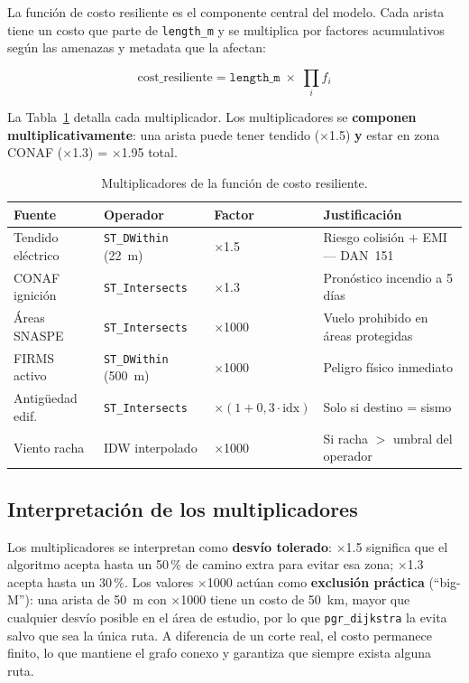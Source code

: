 \documentclass[conference]{IEEEtran}
\begin{document}
La función de costo resiliente es el componente central del modelo. Cada arista tiene un costo que parte de \texttt{length\_m} y se multiplica por factores acumulativos según las amenazas y metadata que la afectan:

\begin{equation}
\boxed{
\text{cost\_resiliente} = \texttt{length\_m} \;\times\; \prod_{i} f_i
}
\label{eq:cost_resiliente}
\end{equation}

La Tabla~\ref{tab:multiplicadores} detalla cada multiplicador. Los multiplicadores se \textbf{componen multiplicativamente}: una arista puede tener tendido ($\times$1.5) \textbf{y} estar en zona CONAF ($\times$1.3) = $\times$1.95 total.

\begin{table}[!htbp]
\centering
\caption{Multiplicadores de la función de costo resiliente.}
\label{tab:multiplicadores}
\scriptsize
\begin{tabularx}{\columnwidth}{lllX}
\toprule
\textbf{Fuente} & \textbf{Operador} & \textbf{Factor} & \textbf{Justificación} \\
\midrule
Tendido eléctrico & \texttt{ST\_DWithin} (22~m) & $\times$1.5 & Riesgo colisión + EMI --- DAN~151 \\
CONAF ignición & \texttt{ST\_Intersects} & $\times$1.3 & Pronóstico incendio a 5 días \\
Áreas SNASPE & \texttt{ST\_Intersects} & $\times$1000 & Vuelo prohibido en áreas protegidas \\
FIRMS activo & \texttt{ST\_DWithin} (500~m) & $\times$1000 & Peligro físico inmediato \\
Antigüedad edif. & \texttt{ST\_Intersects} & $\times(1+0{,}3 \cdot \text{idx})$ & Solo si destino = sismo \\
Viento racha & IDW interpolado & $\times$1000 & Si racha $>$ umbral del operador \\
\bottomrule
\end{tabularx}
\end{table}
\FloatBarrier

\subsection{Interpretación de los multiplicadores}

Los multiplicadores se interpretan como \textbf{desvío tolerado}: $\times$1.5 significa que el algoritmo acepta hasta un 50\,\% de camino extra para evitar esa zona; $\times$1.3 acepta hasta un 30\,\%. Los valores $\times$1000 actúan como \textbf{exclusión práctica} (``big-M''): una arista de 50~m con $\times$1000 tiene un costo de 50~km, mayor que cualquier desvío posible en el área de estudio, por lo que \texttt{pgr\_dijkstra} la evita salvo que sea la única ruta. A diferencia de un corte real, el costo permanece finito, lo que mantiene el grafo conexo y garantiza que siempre exista alguna ruta.
\end{document}
